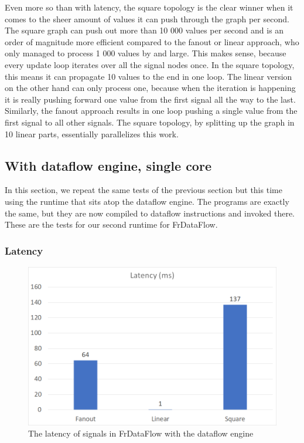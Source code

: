 Even more so than with latency, the square topology is the clear winner when it comes to the sheer amount of values it can push through the graph per second. The square graph can push out more than 10 000 values per second and is an order of magnitude more efficient compared to the fanout or linear approach, who only managed to process 1 000 values by and large. This makes sense, because every update loop iterates over all the signal nodes once. In the square topology, this means it can propagate 10 values to the end in one loop. The linear version on the other hand can only process one, because when the iteration is happening it is really pushing forward one value from the first signal all the way to the last. Similarly, the fanout approach results in one loop pushing a single value from the first signal to all other signals. The square topology, by splitting up the graph in 10 linear parts, essentially 
parallelizes this work. 

\subsection{With dataflow engine, single core}

In this section, we repeat the same tests of the previous section but this time using the runtime that sits atop the dataflow engine. The programs are exactly the same, but they are now compiled to dataflow instructions and invoked there. These are the tests for our second runtime for FrDataFlow. 

\subsubsection{Latency}

\begin{figure}[h]
    \includegraphics[width=\textwidth]{images/Evaluation-WithDataFlow-Latency.png}
	\caption{The latency of signals in FrDataFlow with the dataflow engine}
	\label{fig:evaluation-withdataflow-latency}
\end{figure}

